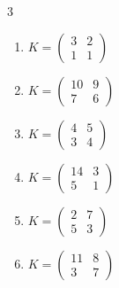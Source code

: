 \begin{multicols}{3}
\begin{enumerate}[label=\arabic*.,  leftmargin=*]
\item $K = \begin{pmatrix} 3 & 2 \\ 1 & 1 \end{pmatrix}$
\item $K = \begin{pmatrix} 10 & 9 \\ 7 & 6 \end{pmatrix}$
\item $K = \begin{pmatrix} 4 & 5 \\ 3 & 4 \end{pmatrix}$
\item $K = \begin{pmatrix} 14 & 3 \\ 5 & 1 \end{pmatrix}$
\item $K = \begin{pmatrix} 2 & 7 \\ 5 & 3 \end{pmatrix}$
\item $K = \begin{pmatrix} 11 & 8 \\ 3 & 7 \end{pmatrix}$
\end{enumerate}
\end{multicols}
